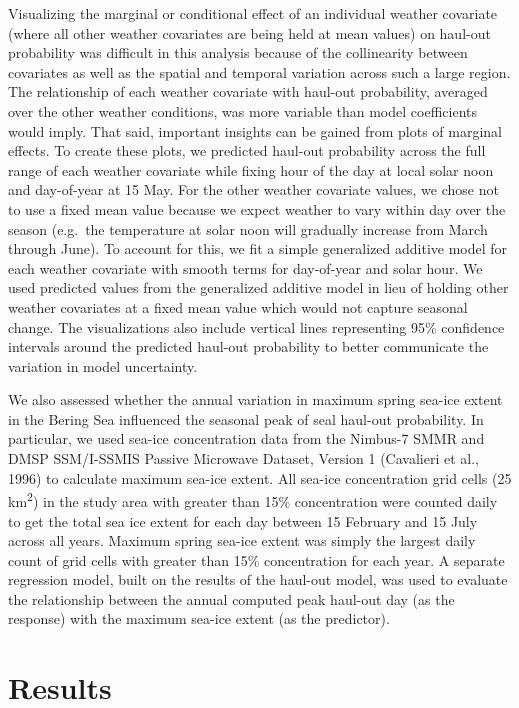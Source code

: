 \documentclass[fleqn,10pt,lineno]{wlpeerj} %
\begin{document}
Visualizing the marginal or conditional effect of an individual weather
covariate (where all other weather covariates are being held at mean values) on
haul-out probability was difficult in this analysis because of the collinearity
between covariates as well as the spatial and temporal variation across such a
large region. The relationship of each weather covariate with haul-out
probability, averaged over the other weather conditions, was more variable than
model coefficients would imply. That said, important insights can be gained from
plots of marginal effects. To create these plots, we predicted haul-out
probability across the full range of each weather covariate while fixing hour
of the day at local solar noon and day-of-year at 15 May. For the other weather
covariate values, we chose not to use a fixed mean value because we expect weather
to vary within day over the season (e.g.~the temperature at solar noon will
gradually increase from March through June). To account for this, we fit a simple generalized
additive model for each weather covariate with smooth terms for day-of-year and
solar hour. We used predicted values from the generalized additive model in lieu
of holding other weather covariates at a fixed mean value which would not capture
seasonal change. The visualizations
also include vertical lines representing 95\% confidence intervals around the
predicted haul-out probability to better communicate the variation in model
uncertainty.

We also assessed whether the annual variation in maximum spring sea-ice extent in the
Bering Sea influenced the seasonal peak of seal haul-out probability. In
particular, we used sea-ice concentration data from the Nimbus-7 SMMR and DMSP
SSM/I-SSMIS Passive Microwave Dataset, Version 1 (Cavalieri et al., 1996) to calculate
maximum sea-ice extent. All sea-ice concentration grid cells (25 km\textsuperscript{2}) in the
study area with greater than 15\% concentration were counted daily to get the total sea
ice extent for each day between 15 February and 15 July across all years.
Maximum spring sea-ice extent was simply the largest daily count of grid cells
with greater than 15\% concentration for each year. A separate regression model,
built on the results of the haul-out model, was used to evaluate the relationship
between the annual computed peak haul-out day (as the response) with the
maximum sea-ice extent (as the predictor).

\hypertarget{results}{%
\section*{Results}\label{results}}
\end{document}
